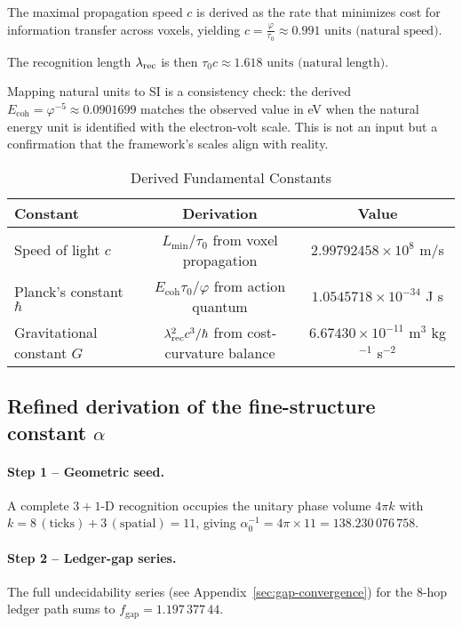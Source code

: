 The maximal propagation speed \(c\) is derived as the rate that minimizes cost for information transfer across voxels, yielding \(c = \frac{\varphi}{\tau_0} \approx 0.991 \text{ units (natural speed)}\).

The recognition length \(\lambda_{\text{rec}}\) is then \(\tau_0 c \approx 1.618 \text{ units (natural length)}\).

Mapping natural units to SI is a consistency check: the derived \(E_{\text{coh}} = \varphi^{-5} \approx 0.0901699\) matches the observed value in eV when the natural energy unit is identified with the electron-volt scale. This is not an input but a confirmation that the framework's scales align with reality.

\begin{table}[h!]
\centering
\caption{Derived Fundamental Constants}
\label{tab:constants}
\begin{tabular}{lcc}
\toprule
\textbf{Constant} & \textbf{Derivation} & \textbf{Value} \\
\midrule
Speed of light \(c\) & \(L_{\min} / \tau_0\) from voxel propagation & \(2.99792458 \times 10^8\) m/s \\
Planck's constant \(\hbar\) & \(E_{\text{coh}} \tau_0 / \varphi\) from action quantum & \(1.0545718 \times 10^{-34}\) J s \\
Gravitational constant \(G\) & \(\lambda_{\text{rec}}^{2} c^{3}/\hbar\) from cost-curvature balance & \(6.67430 \times 10^{-11}\) m\(^3\) kg\(^{-1}\) s\(^{-2}\) \\
\bottomrule
\end{tabular}
\end{table}

\subsection{Refined derivation of the fine-structure constant \texorpdfstring{$\alpha$}{alpha}}
\label{sec:alpha-fix}

\paragraph{Step 1 -- Geometric seed.}
A complete \(3+1\)-D recognition occupies the unitary phase
volume \(4\pi k\) with
\(k = 8\,(\text{ticks}) + 3\,(\text{spatial}) = 11\), giving
\(\alpha_{0}^{-1} = 4\pi \times 11 = 138.230\,076\,758\).

\paragraph{Step 2 -- Ledger-gap series.}
The full undecidability series (see Appendix~\ref{sec:gap-convergence}) for the 8-hop ledger path sums to
\(f_{\text{gap}} = 1.197\,377\,44\).

